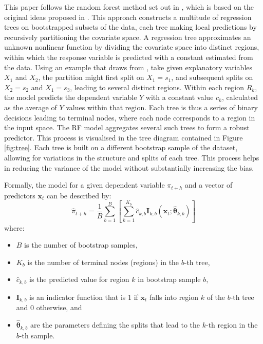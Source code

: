 

This paper follows the random forest method set out in \textcite{Medeiros2021ForecastingMethods}, which is based on the original ideas proposed in \textcite{Breiman2001RandomForests}. This approach constructs a multitude of regression trees on bootstrapped subsets of the data, each tree making local predictions by recursively partitioning the covariate space. A regression tree approximates an unknown nonlinear function by dividing the covariate space into distinct regions, within which the response variable is predicted with a constant estimated from the data. Using an example that draws from \textcite{Hastie2009TheLearning}, take given explanatory variables $X_1$ and $X_2$, the partition might first split on $X_1=s_1$, and subsequent splits on $X_2=s_2$ and $X_1=s_3$, leading to several distinct regions. Within each region $R_k$, the model predicts the dependent variable $Y$ with a constant value $c_k$, calculated as the average of $Y$ values within that region. Each tree is thus a series of binary decisions leading to terminal nodes, where each node corresponds to a region in the input space. The RF model aggregates several such trees to form a robust predictor. This process is visualised in the tree diagram contained in Figure \ref{fig:tree}. Each tree is built on a different bootstrap sample of the dataset, allowing for variations in the structure and splits of each tree. This process helps in reducing the variance of the model without substantially increasing the bias.

Formally, the model for a given dependent variable $\pi_{t+h}$ and a vector of predictors $\boldsymbol{x}_t$ can be described by:
$$
\widehat{\pi}_{t+h} = \frac{1}{B} \sum_{b=1}^B \left[ \sum_{k=1}^{K_b} \widehat{c}_{k, b} \mathbf{I}_{k, b}\left(\boldsymbol{x}_t ; \widehat{\boldsymbol{\theta}}_{k, b}\right) \right]
$$
where:
\begin{itemize}
    \item $B$ is the number of bootstrap samples,
    \item $K_b$ is the number of terminal nodes (regions) in the $b$-th tree,
    \item $\widehat{c}_{k, b}$ is the predicted value for region $k$ in bootstrap sample $b$,
    \item $\mathbf{I}_{k, b}$ is an indicator function that is 1 if $\boldsymbol{x}_t$ falls into region $k$ of the $b$-th tree and 0 otherwise, and
    \item $\widehat{\boldsymbol{\theta}}_{k, b}$ are the parameters defining the splits that lead to the $k$-th region in the $b$-th sample.
\end{itemize}

